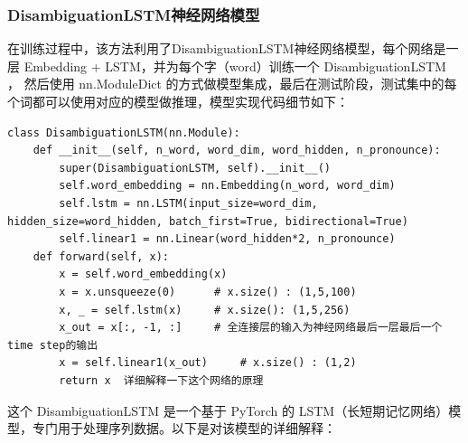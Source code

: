 \documentclass[12pt,hyperref,a4paper,UTF8]{ctexart}
\begin{document}
\subsubsection{DisambiguationLSTM神经网络模型}
在训练过程中，该方法利用了DisambiguationLSTM神经网络模型，每个网络是一层 Embedding + LSTM，并为每个字（word）训练一个 DisambiguationLSTM ， 然后使用 nn.ModuleDict 的方式做模型集成，最后在测试阶段，测试集中的每个词都可以使用对应的模型做推理，模型实现代码细节如下：
\begin{lstlisting}[caption={DisambiguationLSTM神经网络模型实现代码}, label={lst:example}]
class DisambiguationLSTM(nn.Module):
    def __init__(self, n_word, word_dim, word_hidden, n_pronounce):
        super(DisambiguationLSTM, self).__init__()
        self.word_embedding = nn.Embedding(n_word, word_dim)
        self.lstm = nn.LSTM(input_size=word_dim, hidden_size=word_hidden, batch_first=True, bidirectional=True)
        self.linear1 = nn.Linear(word_hidden*2, n_pronounce)
    def forward(self, x):
        x = self.word_embedding(x)
        x = x.unsqueeze(0)      # x.size() : (1,5,100)
        x, _ = self.lstm(x)     # x.size(): (1,5,256)
        x_out = x[:, -1, :]     # 全连接层的输入为神经网络最后一层最后一个time step的输出
        x = self.linear1(x_out)     # x.size() : (1,2)
        return x  详细解释一下这个网络的原理
\end{lstlisting}
这个 DisambiguationLSTM 是一个基于 PyTorch 的 LSTM（长短期记忆网络）模型，专门用于处理序列数据。以下是对该模型的详细解释：
\end{document}
